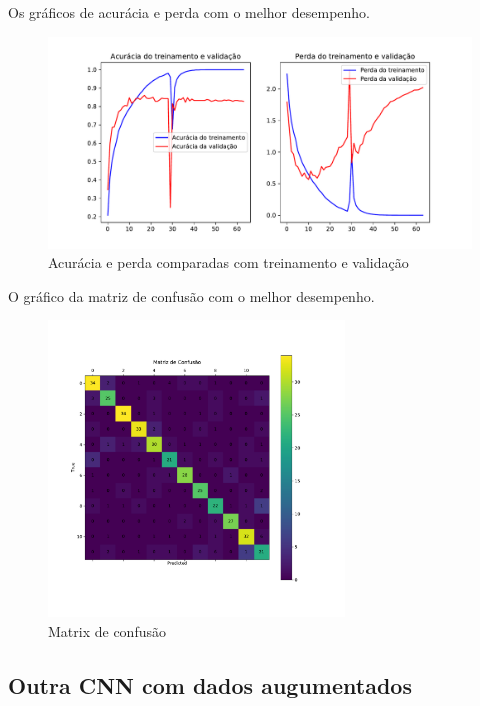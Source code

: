 \documentclass[12pt,
	english,			%
	french,				%
	spanish,			%
	brazil,				%
	]{article}
\begin{document}
Os gráficos de acurácia e perda com o melhor desempenho.

\begin{figure}[!htb]
\centering
\includegraphics[width=1\textwidth]{images/history_lenet5_augmented.pdf}
\caption{\label{fig:grafico01}Acurácia e perda comparadas com treinamento e validação}
\end{figure}

O gráfico da matriz de confusão com o melhor desempenho.

\begin{figure}[!htb]
\centering
\includegraphics[width=0.7\textwidth]{images/cm_lenet5_augmented.pdf}
\caption{\label{fig:grafico01}Matrix de confusão}
\end{figure}


\clearpage

\subsection{Outra CNN com dados augumentados}
\end{document}
